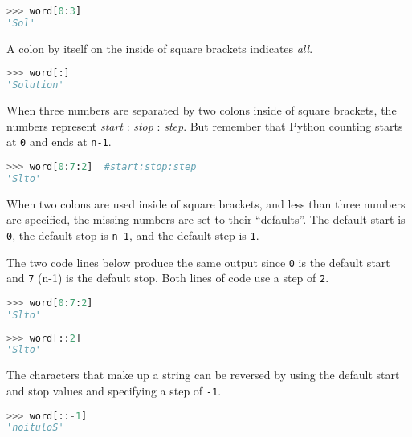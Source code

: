 \documentclass{book}
\newcommand{\passthrough}[1]{#1}
\begin{document}
\begin{lstlisting}[language=Python]
>>> word[0:3]
'Sol'
\end{lstlisting}
    




    
        A colon by itself on the inside of square brackets indicates \emph{all}.

\begin{lstlisting}[language=Python]
>>> word[:]
'Solution'
\end{lstlisting}
    




    
        When three numbers are separated by two colons inside of square
brackets, the numbers represent \emph{start} : \emph{stop} :
\emph{step}. But remember that Python counting starts at
\passthrough{\lstinline!0!} and ends at \passthrough{\lstinline!n-1!}.

\begin{lstlisting}[language=Python]
>>> word[0:7:2]  #start:stop:step
'Slto'
\end{lstlisting}
    




    
        When two colons are used inside of square brackets, and less than three
numbers are specified, the missing numbers are set to their
``defaults''. The default start is \passthrough{\lstinline!0!}, the
default stop is \passthrough{\lstinline!n-1!}, and the default step is
\passthrough{\lstinline!1!}.

The two code lines below produce the same output since
\passthrough{\lstinline!0!} is the default start and
\passthrough{\lstinline!7!} (n-1) is the default stop. Both lines of
code use a step of \passthrough{\lstinline!2!}.

\begin{lstlisting}[language=Python]
>>> word[0:7:2]
'Slto'
\end{lstlisting}

\begin{lstlisting}[language=Python]
>>> word[::2]
'Slto'
\end{lstlisting}

The characters that make up a string can be reversed by using the
default start and stop values and specifying a step of
\passthrough{\lstinline!-1!}.

\begin{lstlisting}[language=Python]
>>> word[::-1]
'noituloS'
\end{lstlisting}
    
\end{document}
